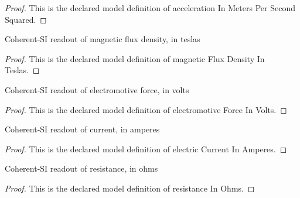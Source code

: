 \begin{proof}
  This is the declared model definition of acceleration In Meters Per Second Squared.
\end{proof}
\begin{definition}
  \label{def:physics:phyx-mini-0981:phyxminiproblems-problemphyxmini0981-magneticfluxdensityinteslas}
  Coherent-SI readout of magnetic flux density, in teslas
\end{definition}
\begin{proof}
  This is the declared model definition of magnetic Flux Density In Teslas.
\end{proof}
\begin{definition}
  \label{def:physics:phyx-mini-0981:phyxminiproblems-problemphyxmini0981-electromotiveforceinvolts}
  Coherent-SI readout of electromotive force, in volts
\end{definition}
\begin{proof}
  This is the declared model definition of electromotive Force In Volts.
\end{proof}
\begin{definition}
  \label{def:physics:phyx-mini-0981:phyxminiproblems-problemphyxmini0981-electriccurrentinamperes}
  Coherent-SI readout of current, in amperes
\end{definition}
\begin{proof}
  This is the declared model definition of electric Current In Amperes.
\end{proof}
\begin{definition}
  \label{def:physics:phyx-mini-0981:phyxminiproblems-problemphyxmini0981-resistanceinohms}
  Coherent-SI readout of resistance, in ohms
\end{definition}
\begin{proof}
  This is the declared model definition of resistance In Ohms.
\end{proof}

